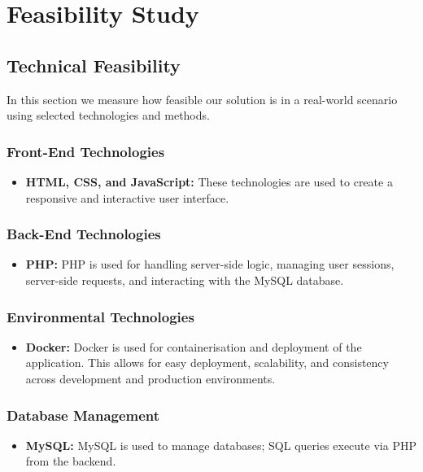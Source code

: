 \documentclass[12pt, a4paper]{report}
\begin{document}
\chapter{Feasibility Study}

\section{Technical Feasibility}

In this section we measure how feasible our solution is in a real-world scenario using selected technologies and methods.

\subsection{Front-End Technologies}
\begin{itemize}
    \item \textbf{HTML, CSS, and JavaScript:} These technologies are used to create a responsive and interactive user interface.
\end{itemize}

\subsection{Back-End Technologies}
\begin{itemize}
    \item \textbf{PHP:} PHP is used for handling server-side logic, managing user sessions, server-side requests, and interacting with the MySQL database.
\end{itemize}

\subsection{Environmental Technologies}
\begin{itemize}
    \item \textbf{Docker:} Docker is used for containerisation and deployment of the application. This allows for easy deployment, scalability, and consistency across development and production environments.
\end{itemize}

\subsection{Database Management}
\begin{itemize}
    \item \textbf{MySQL:} MySQL is used to manage databases; SQL queries execute via PHP from the backend.
\end{itemize}
\end{document}
